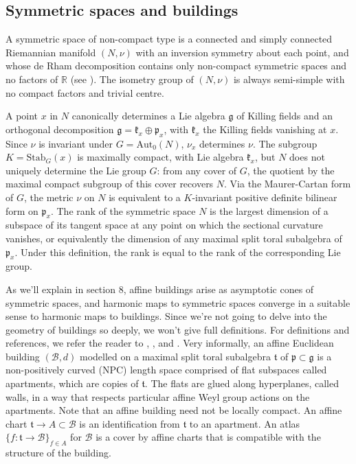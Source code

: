 \documentclass[10pt]{amsart}
\newcommand{\R}{\mathbb R}
\newcommand{\p}{\mathfrak{p}}
\newcommand{\g}{\mathfrak{g}}
\newcommand{\kk}{\mathfrak{k}}
\newcommand{\ft}{\mathfrak{t}}
\theoremstyle{definition}
\begin{document}
\subsection{Symmetric spaces and buildings}\label{sec: symmetric spaces}
A symmetric space of non-compact type is a connected and simply connected Riemannian manifold $(N,\nu)$ with an inversion symmetry about each point, and whose de Rham decomposition contains only non-compact symmetric spaces and no factors of $\R$ (see \cite[Chapter V, \S 4]{Helg}). The isometry group of $(N,\nu)$ is always semi-simple with no compact factors and trivial centre.

A point $x$ in $N$ canonically determines a Lie algebra $\g$ of Killing fields and an orthogonal decomposition $\g = \kk_x \oplus\p_x$, with $\kk_x$ the Killing fields vanishing at $x$. Since $\nu$ is invariant under $G=\textrm{Aut}_0(N)$, $\nu_x$ determines $\nu$. The subgroup $K = \mathrm{Stab}_G(x)$ is maximally compact, with Lie algebra $\kk_x$, but $N$ does not uniquely determine the Lie group $G$: from any cover of $G$, the quotient by the maximal compact subgroup of this cover recovers $N.$ Via the Maurer-Cartan form of $G$, the metric $\nu$ on $N$ is equivalent to a $K$-invariant positive definite bilinear form on $\p_x$. The rank of the symmetric space $N$ is the largest dimension of a subspace of its tangent space at any point on which the sectional curvature vanishes, or equivalently the dimension of any maximal split toral subalgebra of $\p_x$. Under this definition, the rank is equal to the rank of the corresponding Lie group.

As we'll explain in section 8, affine buildings arise as asymptotic cones of symmetric spaces, and harmonic maps to symmetric spaces converge in a suitable sense to harmonic maps to buildings. Since we're not going to delve into the geometry of buildings so deeply, we won't give full definitions. For definitions and references, we refer the reader to \cite{Cu}, \cite[section 2]{KNPS}, and \cite[section 8]{LTW}. Very informally, an affine Euclidean building $(\mathcal{B},d)$ modelled on a maximal split toral subalgebra $\ft$ of $\p\subset \g$ is a non-positively curved (NPC) length space comprised of flat subspaces called apartments, which are copies of $\ft$. The flats are glued along hyperplanes, called walls, in a way that respects particular affine Weyl group actions on the apartments. Note that an affine building need not be locally compact. An affine chart $\ft\to A\subset \mathcal{B}$ is an identification from $\ft$ to an apartment. An atlas $\{f:\ft\to \mathcal{B}\}_{f\in A}$ for $\mathcal{B}$ is a cover by affine charts that is compatible with the structure of the building. 
\end{document}

